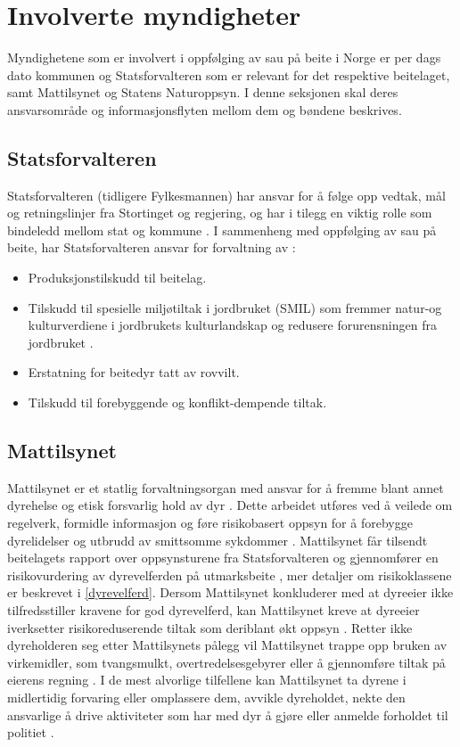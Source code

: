 \section{Involverte myndigheter}
Myndighetene som er involvert i oppfølging av sau på beite i Norge er per dags dato kommunen og Statsforvalteren som er relevant for det respektive beitelaget, samt Mattilsynet og Statens Naturoppsyn. I denne seksjonen skal deres ansvarsområde og informasjonsflyten mellom dem og bøndene beskrives. 

\subsection{Statsforvalteren}
Statsforvalteren (tidligere Fylkesmannen) har ansvar for å følge opp vedtak, mål og retningslinjer fra Stortinget og regjering, og har i tilegg en viktig rolle som bindeledd mellom stat og kommune \cite{Statsforvalteren202HistoriaStatsforvalteren}. I sammenheng med oppfølging av sau på beite, har Statsforvalteren ansvar for forvaltning av  \cite{Statsforvalteren2021Styringsdokumenter}: 
\begin{itemize}
    \item Produksjonstilskudd til beitelag.
    \item Tilskudd til spesielle miljøtiltak i jordbruket (SMIL) som fremmer natur-og kulturverdiene i jordbrukets kulturlandskap og redusere forurensningen fra jordbruket \cite{LandbruksdirektoratetTilskuddSMIL}.
    \item Erstatning for beitedyr tatt av rovvilt.
    \item Tilskudd til forebyggende og konflikt-dempende tiltak.
\end{itemize}

\subsection{Mattilsynet}
Mattilsynet er et statlig forvaltningsorgan med ansvar for å fremme blant annet dyrehelse og etisk forsvarlig hold av dyr \cite{Mattilsynet2021OmMattilsynet}. Dette arbeidet utføres ved å veilede om regelverk, formidle informasjon og føre risikobasert oppsyn for å forebygge dyrelidelser og utbrudd av smittsomme sykdommer \cite{Mattilsynet2021OmMattilsynet, Mattilsynet2021SauGeit}. Mattilsynet får tilsendt beitelagets rapport over oppsynsturene fra Statsforvalteren og gjennomfører en risikovurdering av dyrevelferden på utmarksbeite \cite{Mattilsynet2019TapRovvilt}, mer detaljer om risikoklassene er beskrevet i \ref{dyrevelferd}. Dersom Mattilsynet konkluderer med at dyreeier ikke tilfredsstiller kravene for god dyrevelferd, kan Mattilsynet kreve at dyreeier iverksetter risikoreduserende tiltak som deriblant økt oppsyn \cite{Mattilsynet2019TapRovvilt}. Retter ikke dyreholderen seg etter Mattilsynets pålegg vil Mattilsynet trappe opp bruken av virkemidler, som tvangsmulkt, overtredelsesgebyrer eller å gjennomføre tiltak på eierens regning \cite{Mattilsynet2019TapRovvilt}. I de mest alvorlige tilfellene kan Mattilsynet ta dyrene i midlertidig forvaring eller omplassere dem, avvikle dyreholdet, nekte den ansvarlige å drive aktiviteter som har med dyr å gjøre eller anmelde forholdet til politiet \cite[~s.4]{Mattilsynet2020Mattilsynets2020}. 

